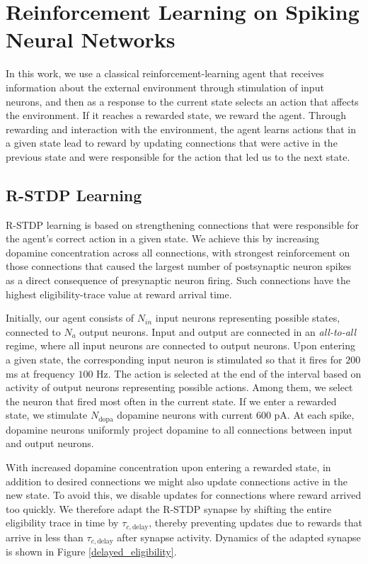 \documentclass[a4paper,12pt,openright]{book}
\begin{document}
\chapter{Reinforcement Learning on Spiking Neural Networks}
\label{sec:reinforcement_learning}
In this work, we use a classical reinforcement-learning agent that receives information about the external environment through stimulation of input neurons, and then as a response to the current state selects an action that affects the environment. If it reaches a rewarded state, we reward the agent. Through rewarding and interaction with the environment, the agent learns actions that in a given state lead to reward by updating connections that were active in the previous state and were responsible for the action that led us to the next state.

\section{R-STDP Learning}
\label{sec:rstdp}
R-STDP learning is based on strengthening connections that were responsible for the agent's correct action in a given state. We achieve this by increasing dopamine concentration across all connections, with strongest reinforcement on those connections that caused the largest number of postsynaptic neuron spikes as a direct consequence of presynaptic neuron firing. Such connections have the highest eligibility-trace value at reward arrival time.

Initially, our agent consists of $N_{in}$ input neurons representing possible states, connected to $N_a$ output neurons. Input and output are connected in an \textit{all-to-all} regime, where all input neurons are connected to output neurons. Upon entering a given state, the corresponding input neuron is stimulated so that it fires for $200$ ms at frequency $100$ Hz. The action is selected at the end of the interval based on activity of output neurons representing possible actions. Among them, we select the neuron that fired most often in the current state. If we enter a rewarded state, we stimulate $N_{\text{dopa}}$ dopamine neurons with current $600$ pA. At each spike, dopamine neurons uniformly project dopamine to all connections between input and output neurons.

With increased dopamine concentration upon entering a rewarded state, in addition to desired connections we might also update connections active in the new state. To avoid this, we disable updates for connections where reward arrived too quickly. We therefore adapt the R-STDP synapse by shifting the entire eligibility trace in time by $\tau_{c, \text{delay}}$, thereby preventing updates due to rewards that arrive in less than $\tau_{c, \text{delay}}$ after synapse activity. Dynamics of the adapted synapse is shown in Figure \ref{delayed_eligibility}.
\end{document}
